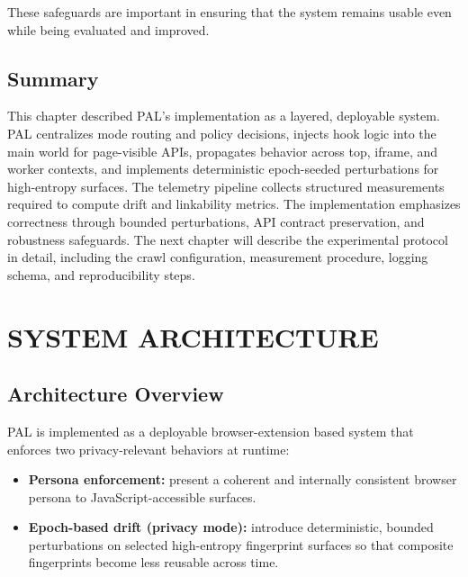 \documentclass[11pt]{report}
\begin{document}
These safeguards are important in ensuring that the system remains usable even while being evaluated and improved.

\section{Summary}

This chapter described PAL’s implementation as a layered, deployable system. PAL centralizes mode routing and policy decisions, injects hook logic into the main world for page-visible APIs, propagates behavior across top, iframe, and worker contexts, and implements deterministic epoch-seeded perturbations for high-entropy surfaces. The telemetry pipeline collects structured measurements required to compute drift and linkability metrics. The implementation emphasizes correctness through bounded perturbations, API contract preservation, and robustness safeguards. The next chapter will describe the experimental protocol in detail, including the crawl configuration, measurement procedure, logging schema, and reproducibility steps.













\chapter{SYSTEM ARCHITECTURE}

\section{Architecture Overview}

PAL is implemented as a deployable browser-extension based system that enforces two privacy-relevant behaviors at runtime:

\begin{itemize}
    \item \textbf{Persona enforcement:} present a coherent and internally consistent browser persona to JavaScript-accessible surfaces.
    \item \textbf{Epoch-based drift (privacy mode):} introduce deterministic, bounded perturbations on selected high-entropy fingerprint surfaces so that composite fingerprints become less reusable across time.
\end{itemize}
\end{document}
